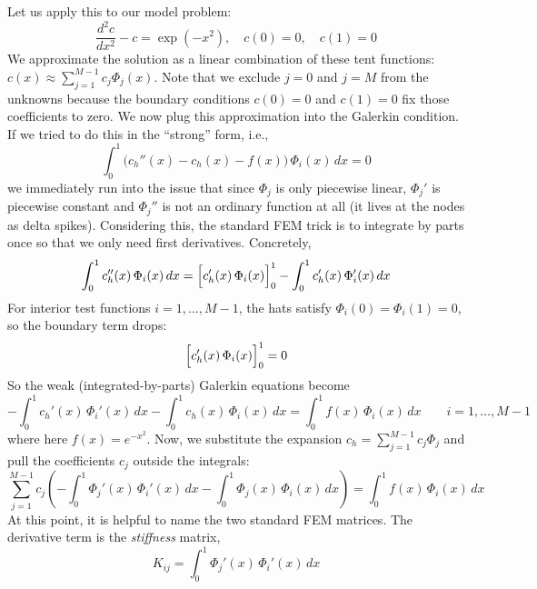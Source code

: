 Let us apply this to our model problem:
\begin{equation}
    \frac{d^2c}{dx^2} - c = \exp(-x^2), \quad c(0)=0, \quad c(1)=0
\end{equation}
We approximate the solution as a linear combination of these tent functions: $c(x) \approx \sum_{j=1}^{M-1} c_j \Phi_j(x)$. Note that we exclude $j=0$ and $j=M$ from the unknowns because the boundary conditions $c(0)=0$ and $c(1)=0$ fix those coefficients to zero. We now plug this approximation into the Galerkin condition. If we tried to do this in the ``strong'' form, i.e.,
\begin{equation}
    \int_0^1 \bigl(c_h''(x) - c_h(x) - f(x)\bigr)\,\Phi_i(x)\,dx = 0
\end{equation}
we immediately run into the issue that since $\Phi_j$ is only piecewise linear, $\Phi_j'$ is piecewise constant and $\Phi_j''$ is not an ordinary function at all (it lives at the nodes as delta spikes). Considering this, the standard FEM trick is to integrate by parts once so that we only need first derivatives. Concretely,
\begin{equation}
    \int_0^1 c_h''(x)\,\Phi_i(x)\,dx
    = \Bigl[c_h'(x)\,\Phi_i(x)\Bigr]_{0}^{1} - \int_0^1 c_h'(x)\,\Phi_i'(x)\,dx
\end{equation}
For interior test functions $i=1,\dots,M-1$, the hats satisfy $\Phi_i(0)=\Phi_i(1)=0$, so the boundary term drops:
\begin{equation}
    \Bigl[c_h'(x)\,\Phi_i(x)\Bigr]_{0}^{1} = 0
\end{equation}
So the weak (integrated-by-parts) Galerkin equations become
\begin{equation}
    -\int_0^1 c_h'(x)\,\Phi_i'(x)\,dx - \int_0^1 c_h(x)\,\Phi_i(x)\,dx
    = \int_0^1 f(x)\,\Phi_i(x)\,dx
    \qquad i=1,\dots,M-1
\end{equation}
where here $f(x)=e^{-x^2}$. Now, we substitute the expansion $c_h=\sum_{j=1}^{M-1}c_j\Phi_j$ and pull the coefficients $c_j$ outside the integrals:
\begin{equation}
    \sum_{j=1}^{M-1} c_j\left(
        -\int_0^1 \Phi_j'(x)\,\Phi_i'(x)\,dx
        -
        \int_0^1 \Phi_j(x)\,\Phi_i(x)\,dx
    \right)
    = \int_0^1 f(x)\,\Phi_i(x)\,dx
\end{equation}
At this point, it is helpful to name the two standard FEM matrices. The derivative term is the \emph{stiffness} matrix,
\begin{equation}
    K_{ij} = \int_0^1 \Phi_j'(x)\,\Phi_i'(x)\,dx
\end{equation}
